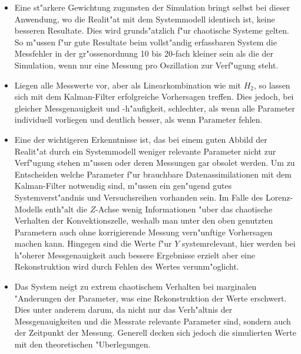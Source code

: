 \begin{refsection}
\begin{itemize}
\item
Eine st"arkere Gewichtung zugunsten der Simulation bringt selbst bei dieser Anwendung, wo die Realit"at mit dem Systemmodell identisch ist, keine besseren Resultate. Dies wird grunds"atzlich f"ur chaotische Systeme gelten. So m"ussen f"ur gute Resultate beim vollst"andig erfassbaren System die Messfehler in der gr"ossenordnung 10 bis 20-fach kleiner sein als die der Simulation, wenn nur eine Messung pro Oszillation zur Verf"ugung steht.

\item
Liegen alle Messwerte vor, aber als Linearkombination wie mit $H_{2}$, so lassen sich mit dem Kalman-Filter erfolgreiche Vorhersagen treffen. Dies jedoch, bei gleicher Messgenauigkeit und -h"aufigkeit, schlechter, als wenn alle Parameter individuell vorliegen und deutlich besser, als wenn Parameter fehlen.

\item
Eine der wichtigeren Erkenntnisse ist, das bei einem guten Abbild der Realit"at durch ein Systemmodell weniger relevante Parameter nicht zur Verf"ugung stehen m"ussen oder deren Messungen gar obsolet werden. Um zu Entscheiden welche Parameter f"ur brauchbare Datenassimilationen mit dem Kalman-Filter notwendig sind, m"ussen ein gen"ugend gutes Systemverst"andnis und Versuchsreihen vorhanden sein. Im Falle des Lorenz-Modells enth"alt die $Z$-Achse wenig Informationen "uber das chaotische Verhalten der Konvektionszelle, weshalb man unter den oben genutzten Parametern auch ohne korrigierende Messung vern"unftige Vorhersagen machen kann. Hingegen sind die Werte f"ur $Y$ systemrelevant, hier werden bei h"oherer Messgenauigkeit auch bessere Ergebnisse erzielt aber eine Rekonstruktion wird durch Fehlen des Wertes verunm"oglicht.

\item
Das System neigt zu extrem chaotischem Verhalten bei marginalen "Anderungen der Parameter, was eine Rekonstruktion der Werte erschwert. Dies unter anderem darum, da nicht nur das Verh"altnis der Messgenauigkeiten und die Messrate relevante Parameter sind, sondern auch der Zeitpunkt der Messung. Generell decken sich jedoch die simulierten Werte mit den theoretischen "Uberlegungen.

\end{itemize}

\printbibliography[heading=subbibliography]
\end{refsection}
